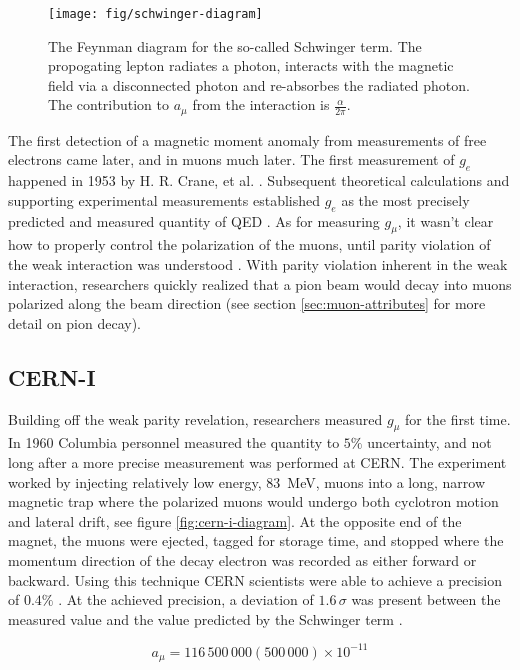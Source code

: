\begin{figure}
\centering
\texttt{[image: fig/schwinger-diagram]}
\caption{The Feynman diagram for the so-called Schwinger term. The propogating lepton radiates a photon, interacts with the magnetic field via a disconnected photon and re-absorbes the radiated photon.  The contribution to $a_\mu$ from the interaction is $\frac{\alpha}{2\pi}$. \label{fig:schwinger-diagram}}
\end{figure}

The first detection of a magnetic moment anomaly from measurements of free electrons came later, and in muons much later.  The first measurement of $g_e$ happened in 1953 by H. R. Crane, et al. \cite{g-e-crane}.  Subsequent theoretical calculations and supporting experimental measurements established $g_e$ as the most precisely predicted and measured quantity of QED \cite{g-e-measurement}.  As for measuring $g_\mu$, it wasn't clear how to properly control the polarization of the muons, until parity violation of the weak interaction was understood \cite{lee-yang, wu-expt}.  With parity violation inherent in the weak interaction, researchers quickly realized that a pion beam would decay into muons polarized along the beam direction (see section \ref{sec:muon-attributes} for more detail on pion decay).

\subsection{CERN-I}
Building off the weak parity revelation, researchers measured $g_\mu$ for the first time.  In 1960 Columbia personnel measured the quantity to $5\%$ uncertainty, and not long after a more precise measurement was performed at CERN.  The experiment worked by injecting relatively low energy, \SI{83}{\MeV}, muons into a long, narrow magnetic trap where the polarized muons would undergo both cyclotron motion and lateral drift, see figure \ref{fig:cern-i-diagram}. At the opposite end of the magnet, the muons were ejected, tagged for storage time, and stopped where the momentum direction of the decay electron was recorded as either forward or backward.  Using this technique CERN scientists were able to achieve a precision of $0.4\%$ \cite{cern-i}.  At the achieved precision, a deviation of $1.6\,\sigma$ was present between the measured value and the value predicted by the Schwinger term \cite{47y-muon-g-2}.

\begin{equation}
\label{eqn:cern-i-results}
a_\mu = 116\,500\,000 (500\,000) \times 10^{-11}
\end{equation}

